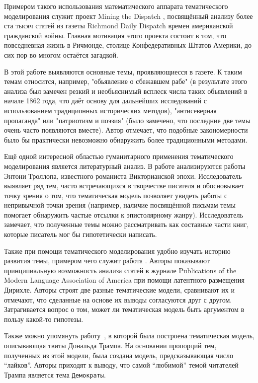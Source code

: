 Примером такого использования математического аппарата тематического моделирования служит проект  Mining the Dispatch \cite{monsters_men,dispatch}, посвящённый анализу более ста тысяч статей из газеты Richmond Daily Dispatch времен американской гражданской войны. Главная мотивация этого проекта состоит в том, что повседневная жизнь в Ричмонде, столице Конфедеративных Штатов Америки, до сих пор во многом остаётся загадкой.

В этой работе выявляются основные темы, проявляющиесся в газете. К таким темам относится, например, "обьявление о сбежавшем рабе" (в результате этого анализа был замечен резкий и необьяснимый всплеск числа таких обьявлений в начале 1862 года, что даёт основу для дальнейших исследований с использованием традиционных исторических методов), "антисеверная пропаганда" или "патриотизм и поэзия" (было замечено, что последние две темы очень часто появляются вместе). Автор отмечает, что подобные закономерности было бы практически невозможно обнаружить более традиционными методами.

Ещё одной интересной областью гуманитарного применения тематического моделирования является литературный анализ. В работе \cite{buurma2015fictionality} анализируются работы Энтони Троллопа, известного романиста Викторианской эпохи. Исследователь выявляет ряд тем, часто встречающихся в творчестве писателя и обосновывает точку зрения о том, что тематическая модель позволяет увидеть работы с непривычной точки зрения (например, наличие посвящённой письмам темы помогает обнаружить частые отсылки к эпистолярному жанру). Исследователь замечает, что полученные темы можно рассматривать как составные части книг, которые писатель мог бы гипотетически написать.

Также при помощи тематического моделирования удобно изучать историю развития темы, примером чего служит работа \cite{goldstone2012can}. Авторы показывают принципиальную возможность анализа статей в журнале Publications of the Modern Language Association of America при помощи латентного размещения Дирихле. Авторы строят две разные тематические модели, сравнивают их и отмечают, что сделанные на основе их выводы согласуются друг с другом. Затрагивается вопрос о том, может ли тематическая модель быть аргументом в пользу какой-то гипотезы.

Также можно упомянуть работу~\cite{wang2016catching}, в которой была построена тематическая модель, описывающая твиты Дональда Трампа. На основании пропорций тем, полученных из этой модели, была создана модель, предсказывающая число ``лайков''. Авторы приходят к выводу, что самой ``любимой'' темой читателей Трампа является тема \texttt{Демократы}.

